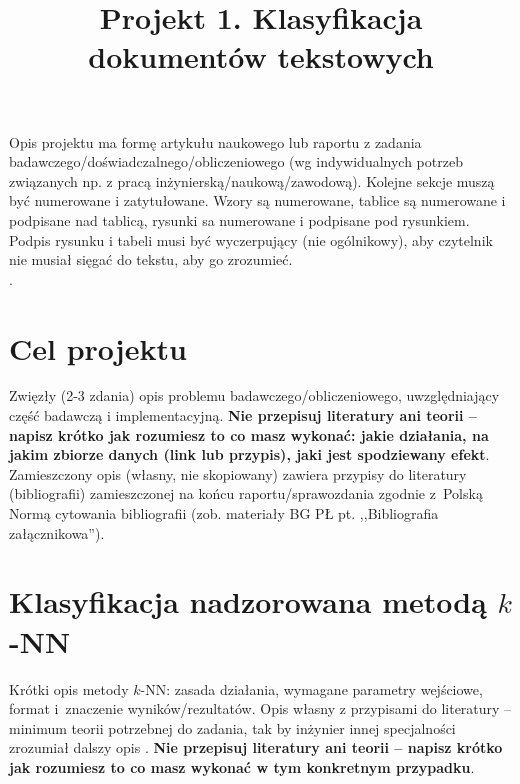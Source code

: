 \documentclass{classrep}
\author{
  \studentinfo{Autor Pierwszy}{229940} \and
  \studentinfo{Autor Drugi}{nr albumu 2} }
\title{Projekt 1. Klasyfikacja dokumentów tekstowych}
\begin{document}
\maketitle

Opis projektu ma formę artykułu naukowego lub raportu z zadania
badawczego/doświadczalnego/obliczeniowego (wg indywidualnych potrzeb związanych np. z
pracą inżynierską/naukową/zawodową). Kolejne sekcje muszą być numerowane i
zatytułowane. Wzory są numerowane, tablice są numerowane i podpisane nad
tablicą, rysunki sa numerowane i podpisane pod rysunkiem. Podpis rysunku i
tabeli musi być wyczerpujący (nie ogólnikowy), aby czytelnik nie musiał sięgać do tekstu, aby go
zrozumieć.\\
. 

\section{Cel projektu}
Zwięzły (2-3 zdania) opis
problemu badawczego/obliczeniowego,  uwzględniający część badawczą i
implementacyjną. {\bf Nie przepisuj literatury ani teorii -- napisz krótko jak
rozumiesz to co masz wykonać: jakie działania, na jakim zbiorze danych (link lub
przypis), jaki jest spodziewany efekt}.\\
\indent Zamieszczony opis (własny, nie skopiowany) zawiera
przypisy do literatury (bibliografii) zamieszczonej na końcu raportu/sprawozdania
zgodnie z~Polską Normą cytowania bibliografii (zob. materiały BG PŁ pt. ,,Bibliografia
załącznikowa'').\\


\section{Klasyfikacja nadzorowana metodą $k$-NN}
Krótki opis metody $k$-NN: zasada działania, wymagane parametry wejściowe, format
i~znaczenie wyników/rezultatów. Opis własny z przypisami do literatury -- minimum
teorii potrzebnej do zadania, tak by inżynier innej specjalności zrozumiał dalszy
opis \cite{tadeusiewicz90}. {\bf Nie przepisuj literatury ani teorii -- napisz krótko jak
rozumiesz to co masz wykonać w tym konkretnym przypadku}.\\
\end{document}
